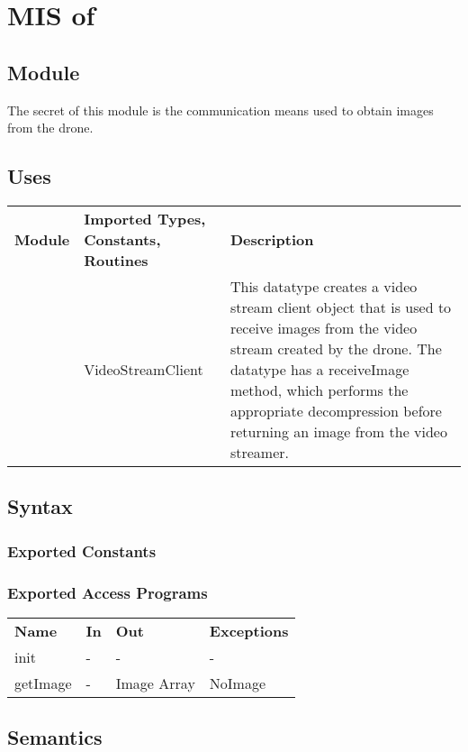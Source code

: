 \documentclass[12pt, titlepage]{article}
\begin{document}
\section{MIS of } \label{MIS_OPERATOR_CAMERA} 
\subsection{Module}
The secret of this module is the communication means used to obtain images from the drone.
\subsection{Uses}
\begin{center}
\begin{tabular}{p{2 cm} p{5cm} p{6.5cm} } 
\hline
\textbf{Module} & \textbf{Imported Types, Constants, Routines} & \textbf{Description} \\
\nameref{GStreamer} & VideoStreamClient & This datatype creates a video stream client object that is used to receive images from the video stream created by the drone. The datatype has a receiveImage method, which performs the appropriate decompression before returning an image from the video streamer. \\
\hline
\hline
\end{tabular}
\end{center}
\subsection{Syntax}
\subsubsection{Exported Constants}
\subsubsection{Exported Access Programs}
\begin{center}
\begin{tabular}{p{3.5cm} p{2.5cm} p{2.5cm} p{5cm}} 
\hline
\textbf{Name} & \textbf{In} & \textbf{Out} & \textbf{Exceptions} \\
init & - & - & - \\
getImage & - & Image Array & NoImage \\
\hline
\hline
\end{tabular}
\end{center}
\subsection{Semantics}
\end{document}
